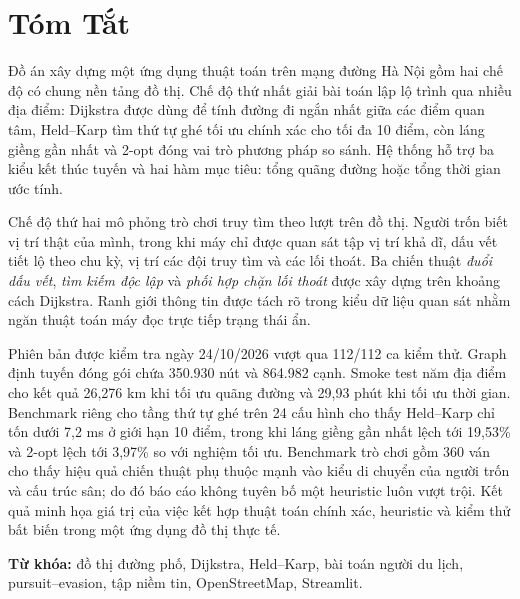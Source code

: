 \chapter*{Tóm Tắt}

Đồ án xây dựng một ứng dụng thuật toán trên mạng đường Hà Nội gồm hai chế độ có
chung nền tảng đồ thị. Chế độ thứ nhất giải bài toán lập lộ trình qua nhiều địa
điểm: Dijkstra được dùng để tính đường đi ngắn nhất giữa các điểm quan tâm,
Held--Karp tìm thứ tự ghé tối ưu chính xác cho tối đa 10 điểm, còn láng giềng gần
nhất và 2-opt đóng vai trò phương pháp so sánh. Hệ thống hỗ trợ ba kiểu kết thúc
tuyến và hai hàm mục tiêu: tổng quãng đường hoặc tổng thời gian ước tính.

Chế độ thứ hai mô phỏng trò chơi truy tìm theo lượt trên đồ thị. Người trốn biết
vị trí thật của mình, trong khi máy chỉ được quan sát tập vị trí khả dĩ, dấu vết
tiết lộ theo chu kỳ, vị trí các đội truy tìm và các lối thoát. Ba chiến thuật
\textit{đuổi dấu vết}, \textit{tìm kiếm độc lập} và \textit{phối hợp chặn lối
thoát} được xây dựng trên khoảng cách Dijkstra. Ranh giới thông tin được tách rõ
trong kiểu dữ liệu quan sát nhằm ngăn thuật toán máy đọc trực tiếp trạng thái ẩn.

Phiên bản được kiểm tra ngày 24/10/2026 vượt qua 112/112 ca kiểm thử. Graph định
tuyến đóng gói chứa 350.930 nút và 864.982 cạnh. Smoke test năm địa điểm cho kết
quả 26,276 km khi tối ưu quãng đường và 29,93 phút khi tối ưu thời gian. Benchmark
riêng cho tầng thứ tự ghé trên 24 cấu hình cho thấy Held--Karp chỉ tốn dưới 7,2 ms
ở giới hạn 10 điểm, trong khi láng giềng gần nhất lệch tới 19,53\% và 2-opt lệch
tới 3,97\% so với nghiệm tối ưu. Benchmark
trò chơi gồm 360 ván cho thấy hiệu quả chiến thuật phụ thuộc mạnh vào kiểu di
chuyển của người trốn và cấu trúc sân; do đó báo cáo không tuyên bố một heuristic
luôn vượt trội. Kết quả minh họa giá trị của việc kết hợp thuật toán chính xác,
heuristic và kiểm thử bất biến trong một ứng dụng đồ thị thực tế.

\textbf{Từ khóa:} đồ thị đường phố, Dijkstra, Held--Karp, bài toán người du lịch,
pursuit--evasion, tập niềm tin, OpenStreetMap, Streamlit.
\clearpage
